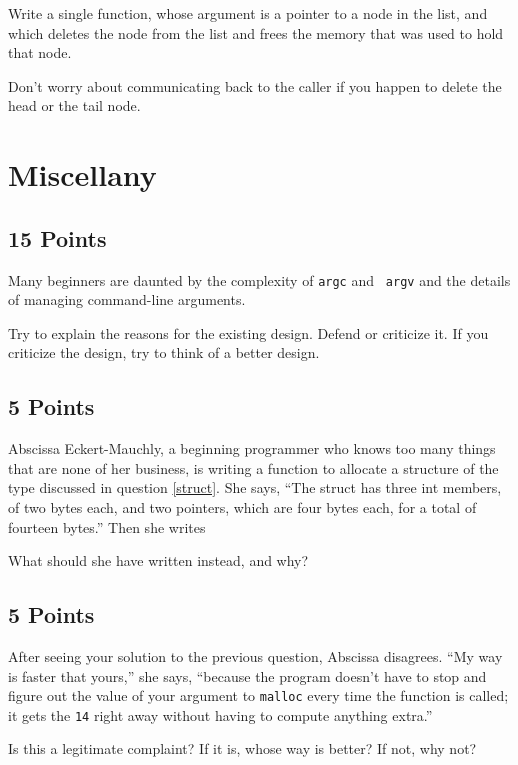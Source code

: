 Write a single function, whose argument is a pointer to a node in the
list, and which deletes the node from the list and frees the memory that
was used to hold that node.

Don't worry about communicating back to the caller if you happen to
delete the head or the tail node.

\section{Miscellany}

\subsection{15 Points}

Many beginners are daunted by the complexity of {\tt argc} and {\tt
argv} and the details of managing command-line arguments.

Try to explain the reasons for the existing design.  Defend or criticize
it.  If you criticize the design, try to think of a better design.

\subsection{5 Points}

Abscissa Eckert-Mauchly, a beginning programmer who knows too many
things that are none of her business, is writing a function to allocate
a structure of the type discussed in question \ref{struct}.  She says,
``The struct has three int members, of two bytes each, and two pointers,
which are four bytes each, for a total of fourteen bytes.''  Then she
writes

\begin{flushleft}
\verb% newnode = malloc(14); %
\end{flushleft}

What should she have written instead, and why?

\subsection{5 Points}

    After seeing your solution to the previous question, Abscissa
disagrees.  ``My way is faster that yours,'' she says, ``because the
program doesn't have to stop and figure out the value of your argument
to {\tt malloc} every time the function is called; it gets the {\tt 14}
right away without having to compute anything extra.''

    Is this a legitimate complaint?  If it is, whose way is better?  If
not, why not?


